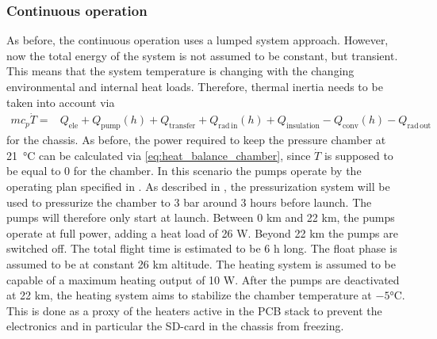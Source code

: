 \subsubsection{Continuous operation}
As before, the continuous operation uses a lumped system approach. However, now the total energy of the system is not assumed to be constant, but transient. This means that the system temperature is changing with the changing environmental and internal heat loads. Therefore, thermal inertia needs to be taken into account via
\begin{align}
    mc_{p}\dot{T} =& Q_\mathrm{ele}+Q_\mathrm{pump}(h)+Q_\mathrm{transfer} + Q_\mathrm{rad\,in}(h) + Q_\mathrm{insulation} - Q_\mathrm{conv}(h) - Q_\mathrm{rad\,out} \label{eq: heat diff chassis}
\end{align}
for the chassis. As before, the power required to keep the pressure chamber at 21 °C can be calculated via \eqref{eq:heat_balance_chamber}, since $\dot{T}$ is supposed to be equal to 0 for the chamber. 
In this scenario the pumps operate by the operating plan specified in . As described in , the pressurization system will be used to pressurize the chamber to 3 bar around 3 hours before launch. The pumps will therefore only start at launch. Between 0 km and 22 km, the pumps operate at full power, adding a heat load of 26 W. Beyond 22 km the pumps are switched off. The total flight time is estimated to be 6 h long.
The float phase is assumed to be at constant 26 km altitude. The heating system is assumed to be capable of a maximum heating output of 10 W.
After the pumps are deactivated at 22 km, the heating system aims to stabilize the chamber temperature at $-5$°C. This is done as a proxy of the heaters active in the PCB stack to prevent the electronics and in particular the SD-card in the chassis from freezing.\par 

